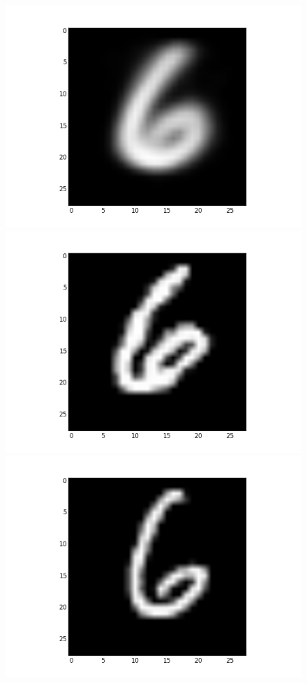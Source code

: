 \documentclass[submit]{harvardml}
\begin{document}
\begin{figure}[ht]
    \centering
    \includegraphics[scale=0.20]{K10-mean-4}
    \includegraphics[scale=0.20]{K10-representative-4-0}
    \includegraphics[scale=0.20]{K10-representative-4-1}

\end{figure}
\end{document}
